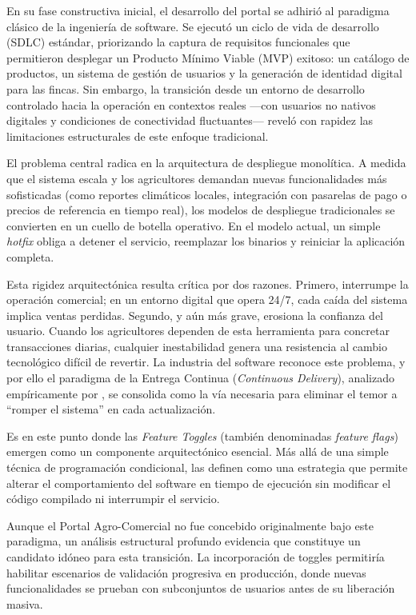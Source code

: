 En su fase constructiva inicial, el desarrollo del portal se adhirió al paradigma clásico de la ingeniería de software. Se ejecutó un ciclo de vida de desarrollo (SDLC) estándar, priorizando la captura de requisitos funcionales que permitieron desplegar un Producto Mínimo Viable (MVP) exitoso: un catálogo de productos, un sistema de gestión de usuarios y la generación de identidad digital para las fincas. Sin embargo, la transición desde un entorno de desarrollo controlado hacia la operación en contextos reales —con usuarios no nativos digitales y condiciones de conectividad fluctuantes— reveló con rapidez las limitaciones estructurales de este enfoque tradicional.

El problema central radica en la arquitectura de despliegue monolítica. A medida que el sistema escala y los agricultores demandan nuevas funcionalidades más sofisticadas (como reportes climáticos locales, integración con pasarelas de pago o precios de referencia en tiempo real), los modelos de despliegue tradicionales se convierten en un cuello de botella operativo. En el modelo actual, un simple \textit{hotfix} obliga a detener el servicio, reemplazar los binarios y reiniciar la aplicación completa.

Esta rigidez arquitectónica resulta crítica por dos razones. Primero, interrumpe la operación comercial; en un entorno digital que opera 24/7, cada caída del sistema implica ventas perdidas. Segundo, y aún más grave, erosiona la confianza del usuario. Cuando los agricultores dependen de esta herramienta para concretar transacciones diarias, cualquier inestabilidad genera una resistencia al cambio tecnológico difícil de revertir. La industria del software reconoce este problema, y por ello el paradigma de la Entrega Continua (\textit{Continuous Delivery}), analizado empíricamente por \cite{meyer2016continuous}, se consolida como la vía necesaria para eliminar el temor a “romper el sistema” en cada actualización.

Es en este punto donde las \textit{Feature Toggles} (también denominadas \textit{feature flags}) emergen como un componente arquitectónico esencial. Más allá de una simple técnica de programación condicional, \cite{rahman2016msr} las definen como una estrategia que permite alterar el comportamiento del software en tiempo de ejecución sin modificar el código compilado ni interrumpir el servicio.

Aunque el Portal Agro-Comercial no fue concebido originalmente bajo este paradigma, un análisis estructural profundo evidencia que constituye un candidato idóneo para esta transición. La incorporación de toggles permitiría habilitar escenarios de validación progresiva en producción, donde nuevas funcionalidades se prueban con subconjuntos de usuarios antes de su liberación masiva.

